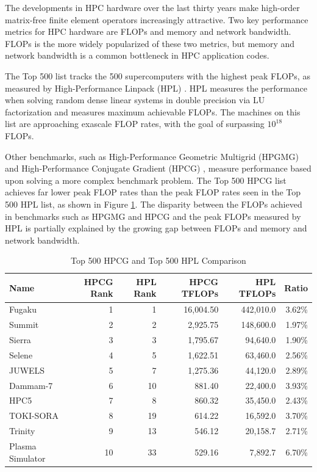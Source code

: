 The developments in HPC hardware over the last thirty years make high-order matrix-free finite element operators increasingly attractive.
Two key performance metrics for HPC hardware are FLOPs and memory and network bandwidth.
FLOPs is the more widely popularized of these two metrics, but memory and network bandwidth is a common bottleneck in HPC application codes. 

The Top 500 \cite{meuertop500} list tracks the 500 supercomputers with the highest peak FLOPs, as measured by High-Performance Linpack (HPL) \cite{petitethpl}.
HPL measures the performance when solving random dense linear systems in double precision via LU factorization and measures maximum achievable FLOPs.
The machines on this list are approaching exascale FLOP rates, with the goal of surpassing $10^{18}$ FLOPs.

Other benchmarks, such as High-Performance Geometric Multigrid (HPGMG) \cite{adams2014hpgmg} and High-Performance Conjugate Gradient (HPCG) \cite{dongarra2016high}, measure performance based upon solving a more complex benchmark problem.
The Top 500 \cite{meuertop500} HPCG list achieves far lower peak FLOP rates than the peak FLOP rates seen in the Top 500 HPL list, as shown in Figure \ref{table:top500}.
The disparity between the FLOPs achieved in benchmarks such as HPGMG and HPCG and the peak FLOPs measured by HPL is partially explained by the growing gap between FLOPs and memory and network bandwidth.

\begin{table}[ht!]
\begin{center}
\begin{tabular}{l r r r r r}
  \toprule
  Name & HPCG Rank & HPL Rank & HPCG TFLOPs & HPL TFLOPs & Ratio \\
  \midrule
  Fugaku           &  1 &  1 & 16,004.50 & 442,010.0 & 3.62\% \\
  Summit           &  2 &  2 &  2,925.75 & 148,600.0 & 1.97\% \\
  Sierra           &  3 &  3 &  1,795.67 &  94,640.0 & 1.90\% \\
  Selene           &  4 &  5 &  1,622.51 &  63,460.0 & 2.56\% \\
  JUWELS           &  5 &  7 &  1,275.36 &  44,120.0 & 2.89\% \\
  Dammam-7         &  6 & 10 &    881.40 &  22,400.0 & 3.93\% \\
  HPC5             &  7 &  8 &    860.32 &  35,450.0 & 2.43\% \\
  TOKI-SORA        &  8 & 19 &    614.22 &  16,592.0 & 3.70\% \\
  Trinity          &  9 & 13 &    546.12 &  20,158.7 & 2.71\% \\
  Plasma Simulator & 10 & 33 &    529.16 &   7,892.7 & 6.70\% \\
  \bottomrule
\end{tabular}
\end{center}
\caption{Top 500 HPCG and Top 500 HPL Comparison}
\label{table:top500}
\end{table}

